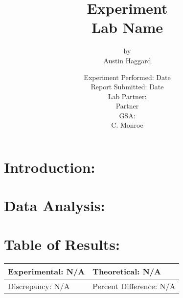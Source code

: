\documentclass{article}
\title{Experiment \2 \\ Lab Name}
\author{by \\ Austin Haggard}
\date{
	Experiment Performed: Date \\
	Report Submitted: Date \\[11pt]
	Lab Partner: \\ Partner \\[11pt] 
	GSA: \\ C. Monroe
}
\begin{document}
\maketitle
\thispagestyle{empty}
\newpage

\section*{Introduction:}
\setcounter{page}{1}

\newpage


\section*{Data Analysis:}
\setcounter{page}{3}

\newpage

\section*{Table of Results:}
\begin{center}
\begin{tabular}{|l|l|}
\hline
	Experimental: N/A & Theoretical: N/A  \\ \hline
	Discrepancy: N/A   & Percent Difference: N/A \\
\hline
\end{tabular}
\end{center}
\end{document}
